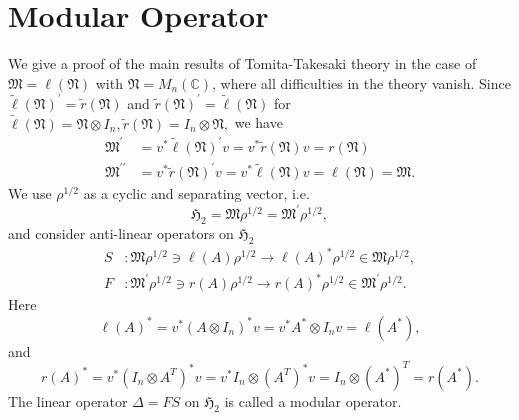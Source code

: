\documentclass{article}
\begin{document}
\section{Modular Operator}
We give a proof  of the main results of Tomita-Takesaki theory in the case of 
$\mathfrak{M}=\ell(\mathfrak{N})$ with $\mathfrak{N}=M_n(\mathbb{C})$,
where all difficulties in the theory vanish.
Since
$\tilde{\ell}(\mathfrak{N})^\prime=\tilde{r}(\mathfrak{N})$ and $\tilde{r}(\mathfrak{N})^\prime=\tilde{\ell}(\mathfrak{N})$ for 
$
\tilde{\ell}(\mathfrak{N})=\mathfrak{N}\otimes I_n,\tilde{r}(\mathfrak{N})=I_n\otimes \mathfrak{N},
$
we have
\begin{equation}
\begin{split}
\mathfrak{M}^\prime&=v^\ast \tilde{\ell}(\mathfrak{N})^\prime v= v^\ast \tilde{r}(\mathfrak{N})v=r(\mathfrak{N}) \\
\mathfrak{M}^{\prime\prime}&=v^\ast \tilde{r}(\mathfrak{N})^\prime v= v^\ast \tilde{\ell}(\mathfrak{N})v=\ell(\mathfrak{N})=\mathfrak{M}.
\end{split}
\end{equation}
We use $\rho^{1/2}$ as a cyclic and separating vector, i.e. 
$$
\mathfrak{H}_2=\mathfrak{M}\rho^{1/2}=\mathfrak{M}^\prime \rho^{1/2},
$$
and consider  anti-linear operators on $\mathfrak{H}_2$ 
\begin{equation}\label{SF}
	 \begin{split}
		 S&:\mathfrak{M}\rho^{1/2}\ni \ell(A) \rho^{1/2} \to \ell(A)^\ast\rho^{1/2}\in\mathfrak{M}\rho^{1/2},\\
		 F&:\mathfrak{M}^\prime \rho^{1/2}\ni r(A) \rho^{1/2} \to r(A)^\ast\rho^{1/2}\in \mathfrak{M}^\prime \rho^{1/2}.
	 \end{split}
\end{equation}
	Here 
	$$
	\ell(A)^\ast=v^\ast(A\otimes I_n)^\ast v=v^\ast A^\ast \otimes I_n v=\ell(A^\ast),
	$$
	and
	$$
  r(A)^\ast=v^\ast (I_n\otimes A^T)^\ast v=v^\ast I_n\otimes (A^T)^\ast v=I_n\otimes (A^\ast)^T=r(A^\ast).
	$$
	The linear operator $\Delta=FS$ on $\mathfrak{H}_2$ is called a modular operator.
\end{document}
